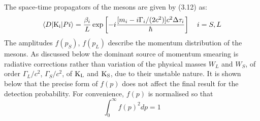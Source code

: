 {    The space-time propagators of the mesons are given by (3.12) as:
      \begin{equation}
   \langle D |{\rm K_i}| Pi  \rangle = \frac{\beta_i}{L}\exp\left[-i \frac{[m_i-i\Gamma_i/(2 c^2)]
    c^2 \Delta \tau_i}{\hbar} \right]~~~i = S,L 
  \end{equation}
    The amplitudes $f(p_S)$,  $f(p_L)$ describe the momentum distribution of the mesons.
    As discussed below the dominant source of momentum smearing is radiative corrections
    rather than variation of the physical masses $W_L$ and $W_S$, of order $\Gamma_L/c^2$, $\Gamma_S/c^2$,
    of ${\rm K_L}$ and ${\rm K_S}$,
   due to their unstable nature. It is shown below that the precise form of  $f(p)$  does not affect the
   final result for the detection probability. For convenience,  $f(p)$ is normalised so that
   \begin{equation}
        \int_{0}^{\infty}f(p)^2 dp = 1
  \end{equation}

}
